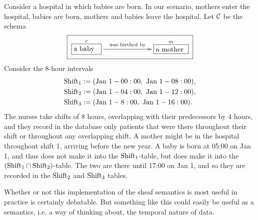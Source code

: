 \documentclass[CT4S-EN-RU]{subfiles}
\begin{document}
\begin{example}

Consider a hospital in which babies are born. In our scenario, mothers enter the hospital, babies are born, mothers and babies leave the hospital. Let $\mathcal{C}$ be the schema 
$$\fbox{\xymatrix{\obox{c}{.5in}{a baby}\LA{rr}{was birthed by}&\hspace{.2in}&\obox{m}{.6in}{a mother}}}$$
Consider the 8-hour intervals 
\begin{align*}
\textnormal{Shift}_1&:=(\textnormal{Jan }1 - 00:00,\textnormal{ Jan }1 - 08:00),\\
\textnormal{Shift}_2&:=(\textnormal{Jan }1 - 04:00,\textnormal{ Jan }1 - 12:00),\\
\textnormal{Shift}_3&:=(\textnormal{Jan }1 - 8:00,\textnormal{ Jan }1 - 16:00).
\end{align*}
The nurses take shifts of 8 hours, overlapping with their predecessors by 4 hours, and they record in the database only patients that were there throughout their shift or throughout any overlapping shift. A mother might be in the hospital throughout shift 1, arriving before the new year. A baby is born at 05:00 on Jan 1, and thus does not make it into the $\textnormal{Shift}_1$-table, but does make it into the $(\textnormal{Shift}_1\cap\textnormal{Shift}_2)$-table. The two are there until 17:00 on Jan 1, and so they are recorded in the $\textnormal{Shift}_2$ and $\textnormal{Shift}_3$ tables. 

\end{example}

Whether or not this implementation of the sheaf semantics is most useful in practice is certainly debatable. But something like this could easily be useful as a semantics, i.e. a way of thinking about, the temporal nature of data.
\end{document}
